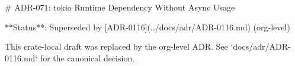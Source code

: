 # ADR-071: tokio Runtime Dependency Without Async Usage

**Status**: Superseded by [ADR-0116](../docs/adr/ADR-0116.md) (org-level)

This crate-local draft was replaced by the org-level ADR. See `docs/adr/ADR-0116.md` for the canonical decision.
